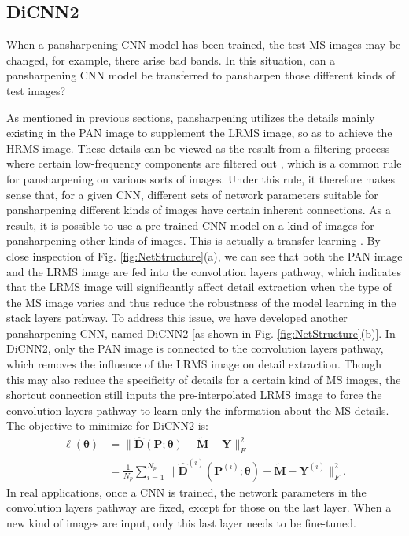 \documentclass[journal]{IEEEtran}
\begin{document}
\subsection{DiCNN2}

 When a pansharpening CNN model has been trained, the test MS images may be changed, for example, there arise bad bands. In this situation, can a pansharpening CNN model be transferred to pansharpen those different kinds of test images?

 As mentioned in previous sections, pansharpening utilizes the details mainly existing in the PAN image to supplement the LRMS image, so as to achieve the HRMS image. These details can be viewed as the result from a filtering process where certain low-frequency components are filtered out \cite{Wei2015Bayesian},
which is a common rule for pansharpening on various sorts of images. Under this rule, it therefore makes sense that, for a given CNN, different sets of network parameters suitable for pansharpening different kinds of images have certain inherent connections. As a result, it is possible to use a pre-trained CNN model on a kind of images for pansharpening other kinds of images. This is actually a transfer learning \cite{Yosinski2014How}. By close inspection of Fig. \ref{fig:NetStructure}(a), we can see that both the PAN image and the LRMS image are fed into the convolution layers pathway, which indicates that the LRMS image will significantly affect detail extraction when the type of the MS image varies and thus reduce the robustness of the model learning in the stack layers pathway. To address this issue, we have developed another pansharpening CNN, named DiCNN2 [as shown in Fig. \ref{fig:NetStructure}(b)]. In DiCNN2, only the PAN image is connected to the convolution layers pathway, which removes the influence of the LRMS image on detail extraction. Though this may also reduce the specificity of details for a certain kind of MS images, the shortcut connection still inputs the pre-interpolated LRMS image to force the convolution layers pathway to learn only the information about the MS details. The objective to minimize for DiCNN2 is:
\begin{equation}
\label{eq:DICNN2}
\begin{split}
\ell(\pmb{\theta})    &= \|\widehat{\mathbf{D}}({\mathbf{P}};\pmb{\theta}) + \widetilde {\mathbf{M}} - {\mathbf{Y}}\|^2_F\\
&= \frac{1}{N_p} \sum_{i=1}^{N_p} \|\widehat{\mathbf{D}}^{(i)}(\mathbf{P}^{(i)};\pmb{\theta}) + \widetilde {\mathbf{M}} - {\mathbf{Y}^{(i)}}\|^2_F.
\end{split}
\end{equation}
In real applications, once a CNN is trained, the network parameters in the convolution layers pathway are fixed, except for those on the last layer. When a new kind of images are input, only this last layer needs to be fine-tuned.
\end{document}
